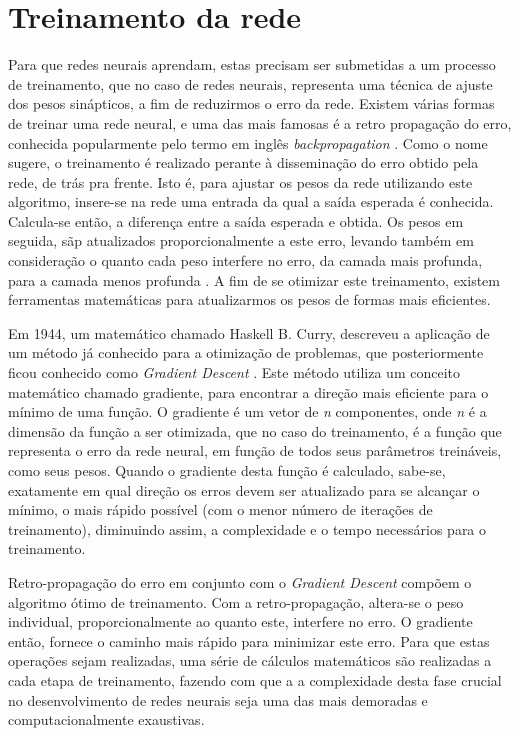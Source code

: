 \section{Treinamento da rede}
\label{sec:train}

Para que redes neurais aprendam, estas precisam ser submetidas a um processo de treinamento, que no caso de redes neurais, representa uma técnica de ajuste dos pesos sinápticos, a fim de reduzirmos o erro da rede. Existem várias formas de treinar uma rede neural, e uma das mais famosas é a retro propagação do erro, conhecida popularmente pelo termo em inglês \textit{backpropagation} \cite{rumelhart_learning_1986}. Como o nome sugere, o treinamento é realizado perante à disseminação do erro obtido pela rede, de trás pra frente. Isto é, para ajustar os pesos da rede utilizando este algoritmo, insere-se na rede uma entrada da qual a saída esperada é conhecida. Calcula-se então, a diferença entre a saída esperada e obtida. Os pesos em seguida, sãp atualizados proporcionalmente a este erro, levando também em consideração o quanto cada peso interfere no erro, da camada mais profunda, para a camada menos profunda \cite{rumelhart_learning_1986}. A fim de se otimizar este treinamento, existem ferramentas matemáticas para atualizarmos os pesos de formas mais eficientes.

Em 1944, um matemático chamado Haskell B. Curry, descreveu a aplicação de um método já conhecido para a otimização de problemas, que posteriormente ficou conhecido como \textit{Gradient Descent} \cite{curry_method_1944}. Este método utiliza um conceito matemático chamado gradiente, para encontrar a direção mais eficiente para o mínimo de uma função. O gradiente é um vetor de \textit{n} componentes, onde \textit{n} é a dimensão da função a ser otimizada, que no caso do treinamento, é a função que representa o erro da rede neural, em função de todos seus parâmetros treináveis, como seus pesos. Quando o gradiente desta função é calculado, sabe-se, exatamente em qual direção os erros devem ser atualizado para se alcançar o mínimo, o mais rápido possível (com o menor número de iterações de treinamento), diminuindo assim, a complexidade e o tempo necessários para o treinamento.

Retro-propagação do erro em conjunto com o \textit{Gradient Descent} compõem o algoritmo ótimo de treinamento. Com a retro-propagação, altera-se o peso individual, proporcionalmente ao quanto este, interfere no erro. O gradiente então, fornece o caminho mais rápido para minimizar este erro. Para que estas operações sejam realizadas, uma série de cálculos matemáticos são realizadas a cada etapa de treinamento, fazendo com que a a complexidade desta fase crucial no desenvolvimento de redes neurais seja uma das mais demoradas e computacionalmente exaustivas.

